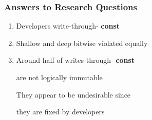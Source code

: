 \documentclass[aspectratio=43]{beamer}
\newcommand{\const}{{\color{blue} \bfseries \ttfamily const}}
\begin{document}
  \begin{frame}
    \frametitle{Answers to Research Questions}
    \large
    \begin{enumerate}
      \setlength\itemsep{0.5em}
      \item Developers write-through-\const{}
      \item Shallow and deep bitwise violated equally
      \item Around half of writes-through-\const{}

            are not logically immutable

            \vspace{2em}
            They appear to be undesirable since

            they are fixed by developers
    \end{enumerate}
  \end{frame}
\end{document}

